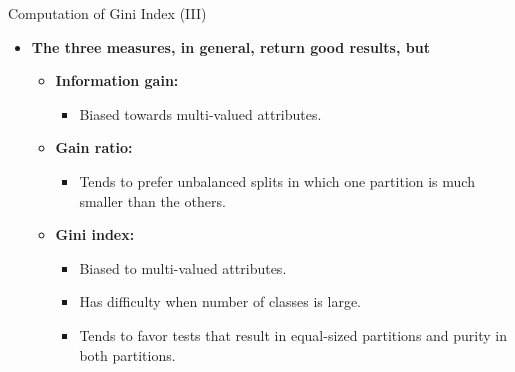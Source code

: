 \begin{frame}{Computation of Gini Index (III)}
  \begin{itemize}
  \item \textbf{The three measures, in general, return good results, but}
    \begin{itemize}
    \item \textbf{\color{airforceblue}Information gain:}
      \begin{itemize}
      \item Biased towards multi-valued attributes.
      \end{itemize}
    \item \textbf{\color{airforceblue}Gain ratio:}
      \begin{itemize}
      \item Tends to prefer unbalanced splits in which one partition is much smaller than the others.
      \end{itemize}
    \item \textbf{\color{airforceblue}Gini index:}
      \begin{itemize}
      \item Biased to multi-valued attributes.
      \item Has difficulty when number of classes is large.
      \item Tends to favor tests that result in equal-sized partitions and purity in both partitions.
      \end{itemize}
    \end{itemize}
  \end{itemize}
\end{frame}

